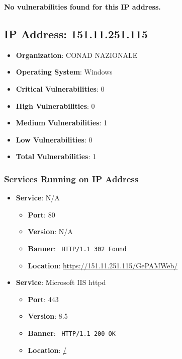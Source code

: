 \documentclass{article}
\begin{document}
\textbf{No vulnerabilities found for this IP address.}




\clearpage



\subsection*{IP Address: 151.11.251.115}

\begin{itemize}
    \item \textbf{Organization}: CONAD NAZIONALE
    \item \textbf{Operating System}:  Windows 
    \item \textbf{Critical Vulnerabilities}: 0
    \item \textbf{High Vulnerabilities}: 0
    \item \textbf{Medium Vulnerabilities}: 1
    \item \textbf{Low Vulnerabilities}: 0
    \item \textbf{Total Vulnerabilities}: 1
\end{itemize}

\subsubsection*{Services Running on IP Address}

\begin{itemize}
    
        \item \textbf{Service}: N/A
        \begin{itemize}
            \item \textbf{Port}: 80
            \item \textbf{Version}:  N/A 
            \item \textbf{Banner}: \texttt{
                HTTP/1.1 302 Found
            }
            \item \textbf{Location}: \href{ https://151.11.251.115/GePAMWeb/ }{ https://151.11.251.115/GePAMWeb/ }
        \end{itemize}
    
        \item \textbf{Service}: Microsoft IIS httpd
        \begin{itemize}
            \item \textbf{Port}: 443
            \item \textbf{Version}:  8.5 
            \item \textbf{Banner}: \texttt{
                HTTP/1.1 200 OK
            }
            \item \textbf{Location}: \href{ / }{ / }
        \end{itemize}
    
\end{itemize}
\end{document}
